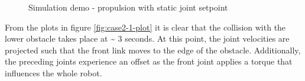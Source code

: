 \begin{figure}[h!]
    \hfil

    \caption{Simulation demo - propulsion with static joint setpoint}
    \label{fig:case2-1}
\end{figure}

From the plots in figure \ref{fig:case2-1-plot} it is clear that the collision with the lower obstacle takes place at \textasciitilde{} 3 seconds. At this point, the joint velocities are projected such that the front link moves to the edge of the obstacle. Additionally, the preceding joints experience an offset as the front joint applies a torque that influences the whole robot.

